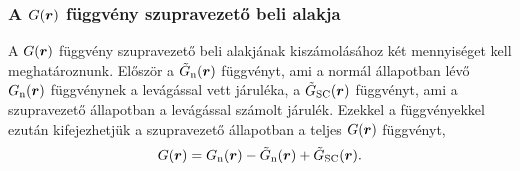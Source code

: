 \documentclass[a4paper,12pt,titlepage]{article}
\newcommand{\RR}{{\vb*{r}}}
\begin{document}
\subsubsection{A $G(\RR)$ függvény szupravezető beli alakja}

A $G(\RR)$ függvény szupravezető beli alakjának kiszámolásához két mennyiséget kell meghatároznunk.  Először a $\tilde{G}_\text{n}(\RR)$ függvényt, ami a normál állapotban lévő $G_\text{n}(\RR)$ függvénynek a levágással vett járuléka, a $\tilde{G}_\text{SC}(\RR)$ függvényt, ami a szupravezető állapotban a levágással számolt járulék.  Ezekkel a függvényekkel ezután kifejezhetjük a szupravezető állapotban a teljes $G(\RR)$ függvényt,
\begin{equation}
	G(\RR) = G_\text{n}(\RR) - \tilde{G}_\text{n}(\RR) + \tilde{G}_\text{SC}(\RR).
\end{equation}
\end{document}
